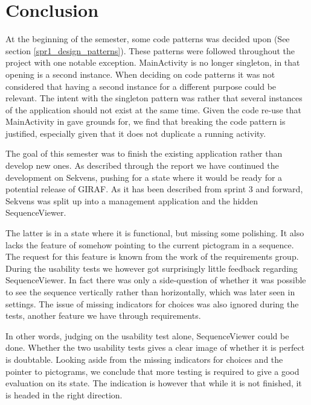 \section{Conclusion}\label{sec:conclusion}

At the beginning of the semester, some code patterns was decided upon (See section \ref{spr1_design_patterns}). These patterns were followed throughout the project with one notable exception. MainActivity is no longer singleton, in that opening  is a second instance. When deciding on code patterns it was not considered that having a second instance for a different purpose could be relevant. The intent with the singleton pattern was rather that several instances of the application should not exist at the same time. Given the code re-use that MainActivity in  gave grounds for, we find that breaking the code pattern is justified, especially given that it does not duplicate a running activity.

The goal of this semester was to finish the existing application rather than develop new ones. As described through the report we have continued the development on Sekvens, pushing for a state where it would be ready for a potential release of GIRAF. As it has been described from sprint 3 and forward, Sekvens was split up into a management application and the hidden SequenceViewer.

The latter is in a state where it is functional, but missing some polishing. It also lacks the feature of somehow pointing to the current pictogram in a sequence. The request for this feature is known from the work of the requirements group. During the usability tests we however got surprisingly little feedback regarding SequenceViewer. In fact there was only a side-question of whether it was possible to see the sequence vertically rather than horizontally, which was later seen in settings. The issue of missing indicators for choices was also ignored during the tests, another feature we have through requirements.

In other words, judging on the usability test alone, SequenceViewer could be done. Whether the two usability tests gives a clear image of whether it is perfect is doubtable. Looking aside from the missing indicators for choices and the pointer to pictograms, we conclude that more testing is required to give a good evaluation on its state. The indication is however that while it is not finished, it is headed in the right direction.

